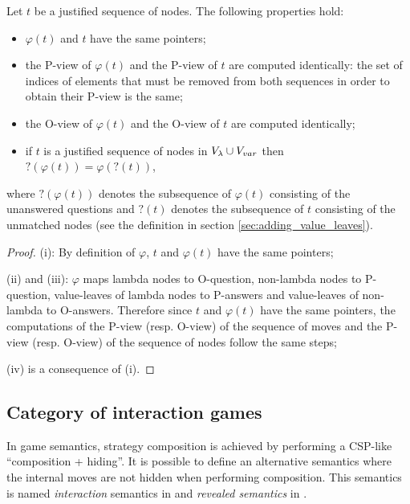 \begin{property}
\label{proper:phi_pview} Let $t$ be a justified sequence of nodes. The following properties hold:
\begin{itemize}
\item[(i)] $\varphi(t)$ and $t$ have the same pointers;
\item[(ii)] the P-view of $\varphi(t)$ and the P-view of $t$ are computed
identically: the set of indices of elements that must be removed
from both sequences in order to obtain their P-view is the same;
\item[(iii)] the O-view of $\varphi(t)$ and the O-view of $t$ are computed identically;
\item[(iv)] if $t$ is a justified sequence of nodes in $V_\lambda \cup V_{var}$ then $?(\varphi(t)) =
\varphi(?(t))$,
\end{itemize}
where $?(\varphi(t))$ denotes the subsequence of $\varphi(t)$ consisting of the unanswered questions 
and $?(t)$ denotes the subsequence of $t$ consisting of the unmatched nodes (see the
definition in section \ref{sec:adding_value_leaves}).
\end{property}
\begin{proof}
(i): By definition of $\varphi$, $t$ and $\varphi(t)$ have the same
pointers;

(ii) and (iii): $\varphi$ maps lambda nodes to O-question,
non-lambda nodes to P-question, value-leaves of lambda nodes to P-answers and
value-leaves of non-lambda to O-answers. Therefore since $t$ and $\varphi(t)$ have the
same pointers, the computations of the P-view (resp. O-view) of the
sequence of moves and the P-view (resp. O-view) of the sequence of
nodes follow the same steps;

(iv) is a consequence of (i).

\end{proof}


\subsection{Category of interaction games}
\label{sec:interaction_semantics}

In game semantics, strategy composition is achieved by performing a
CSP-like ``composition + hiding''. It is possible to define an
alternative semantics where the internal moves are not hidden when
performing composition. This semantics is named \emph{interaction}
semantics in \cite{DBLP:conf/sas/DimovskiGL05} and \emph{revealed
semantics} in \cite{willgreenlandthesis}.

